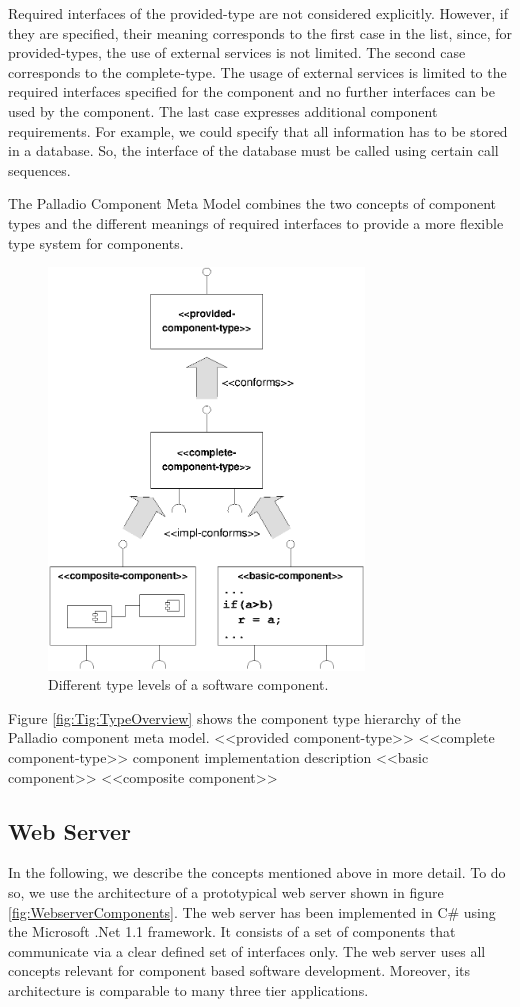 Required interfaces of the provided-type are not considered explicitly. However,
if they are specified, their meaning corresponds to the first case in the list,
since, for provided-types, the use of external services is not limited. The
second case corresponds to the complete-type. The usage of external services is
limited to the required interfaces specified for the component and no further
interfaces can be used by the component. The last case expresses additional
component requirements. For example, we could specify that all information has
to be stored in a database. So, the interface of the database must be called
using certain call sequences.

The Palladio Component Meta Model combines the two concepts of component types
and the different meanings of required interfaces to provide a more flexible
type system for components.

\begin{figure}[htbp]
\centering
\includegraphics[width=3.3in]{example/Overview_TypeHierarchie}
\caption{Different type levels of a software component.}
\label{fig:TypeOverview}
\end{figure}

Figure \ref{fig:Tig:TypeOverview} shows the component type
hierarchy of the Palladio component meta model.
<<provided component-type>>
<<complete component-type>>
component implementation description
<<basic component>> <<composite component>>


\subsection*{Web Server}
In the following, we describe the concepts mentioned above in more detail. To do
so, we use the architecture of a prototypical web server shown in figure
\ref{fig:WebserverComponents}. The web server has been implemented in C\#
using the Microsoft .Net 1.1 framework. It consists of a set of components that
communicate via a clear defined set of interfaces only. The web server uses all
concepts relevant for component based software development. Moreover, its
architecture is comparable to many three tier applications.

